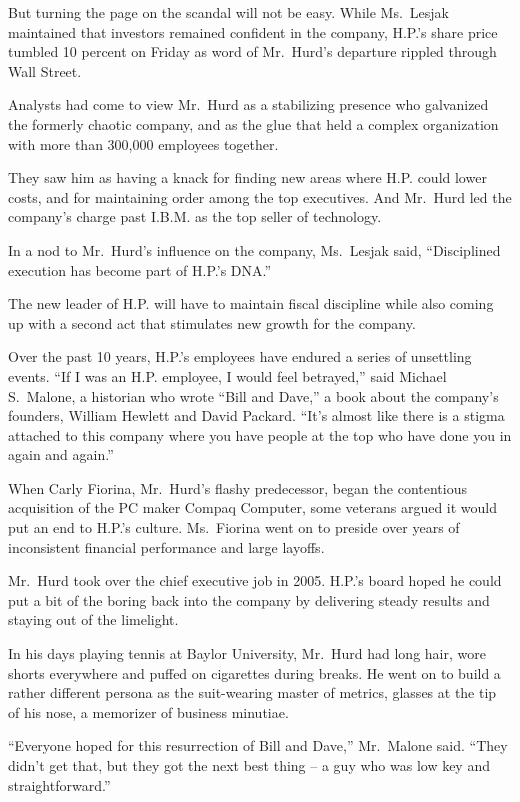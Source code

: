 ﻿\documentclass[12pt]{article}
\begin{document}
But turning the page on the scandal will not be easy. While Ms.~Lesjak maintained that investors
remained confident in the company, H.P.'s share price tumbled 10 percent on Friday as word of
Mr.~Hurd's departure rippled through Wall Street.

Analysts had come to view Mr.~Hurd as a stabilizing presence who galvanized the formerly chaotic
company, and as the glue that held a complex organization with more than 300,000 employees together.

They saw him as having a knack for finding new areas where H.P. could lower costs, and for
maintaining order among the top executives. And Mr.~Hurd led the company's charge past I.B.M. as the
top seller of technology.

In a nod to Mr.~Hurd's influence on the company, Ms.~Lesjak said, ``Disciplined execution has become
part of H.P.'s DNA.''

The new leader of H.P. will have to maintain fiscal discipline while also coming up with a second
act that stimulates new growth for the company.

Over the past 10 years, H.P.'s employees have endured a series of unsettling events. ``If I was an
H.P. employee, I would feel betrayed,'' said Michael S.~Malone, a historian who wrote ``Bill and
Dave,'' a book about the company's founders, William Hewlett and David Packard. ``It's almost like
there is a stigma attached to this company where you have people at the top who have done you in
again and again.''

When Carly Fiorina, Mr.~Hurd's flashy predecessor, began the contentious acquisition of the PC maker
Compaq Computer, some veterans argued it would put an end to H.P.'s culture. Ms.~Fiorina went on to
preside over years of inconsistent financial performance and large layoffs.

Mr.~Hurd took over the chief executive job in 2005. H.P.'s board hoped he could put a bit of the
boring back into the company by delivering steady results and staying out of the limelight.

In his days playing tennis at Baylor University, Mr.~Hurd had long hair, wore shorts everywhere and
puffed on cigarettes during breaks. He went on to build a rather different persona as the
suit-wearing master of metrics, glasses at the tip of his nose, a memorizer of business minutiae.

``Everyone hoped for this resurrection of Bill and Dave,'' Mr.~Malone said. ``They didn't get that,
but they got the next best thing -- a guy who was low key and straightforward.''
\end{document}
